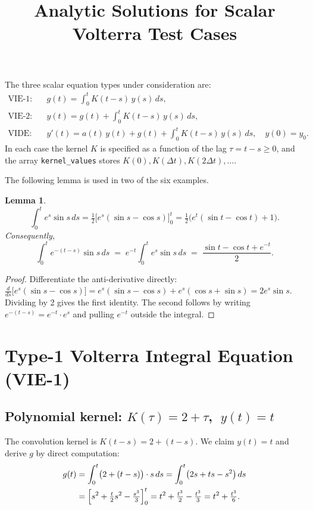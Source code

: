 \documentclass[11pt]{article}
\title{Analytic Solutions for Scalar Volterra Test Cases}
\author{}
\date{}
\newtheorem{lemma}{Lemma}
\begin{document}
\maketitle

The three scalar equation types under consideration are:
\begin{align}
  \text{VIE-1:} \quad & g(t) = \int_0^t K(t-s)\,y(s)\,ds,
    \label{eq:vie1} \\[4pt]
  \text{VIE-2:} \quad & y(t) = g(t) + \int_0^t K(t-s)\,y(s)\,ds,
    \label{eq:vie2} \\[4pt]
  \text{VIDE:}  \quad & y'(t) = a(t)\,y(t) + g(t) + \int_0^t K(t-s)\,y(s)\,ds,
    \quad y(0)=y_0.
    \label{eq:vide}
\end{align}
In each case the kernel $K$ is specified as a function of the lag $\tau = t-s \ge 0$,
and the array \texttt{kernel\_values} stores $K(0), K(\Delta t), K(2\Delta t),\ldots$.

The following lemma is used in two of the six examples.

\begin{lemma}
\label{lem:expsin}
\[
  \int_0^t e^{s}\sin s\,ds = \tfrac{1}{2}\bigl[e^{s}(\sin s - \cos s)\bigr]_0^t
  = \tfrac{1}{2}\bigl(e^t(\sin t-\cos t)+1\bigr).
\]
Consequently,
\[
  \int_0^t e^{-(t-s)}\sin s\,ds
  \;=\; e^{-t}\int_0^t e^{s}\sin s\,ds
  \;=\; \frac{\sin t - \cos t + e^{-t}}{2}.
\]
\end{lemma}
\begin{proof}
Differentiate the anti-derivative directly:
$\tfrac{d}{ds}\bigl[e^s(\sin s-\cos s)\bigr] = e^s(\sin s-\cos s)+e^s(\cos s+\sin s) = 2e^s\sin s$.
Dividing by 2 gives the first identity.  The second follows by writing
$e^{-(t-s)} = e^{-t}\cdot e^s$ and pulling $e^{-t}$ outside the integral.
\end{proof}

\section{Type-1 Volterra Integral Equation (VIE-1)}

\subsection{Polynomial kernel: $K(\tau)=2+\tau$, $\;y(t)=t$}

The convolution kernel is $K(t-s)=2+(t-s)$.
We claim $y(t)=t$ and derive $g$ by direct computation:
\begin{align*}
  g(t) &= \int_0^t \bigl(2+(t-s)\bigr)\cdot s\,ds
         = \int_0^t \bigl(2s + ts - s^2\bigr)\,ds \\
       &= \Bigl[s^2 + \tfrac{t}{2}s^2 - \tfrac{s^3}{3}\Bigr]_0^t
         = t^2 + \tfrac{t^3}{2} - \tfrac{t^3}{3}
         = t^2 + \tfrac{t^3}{6}.
\end{align*}
\end{document}
